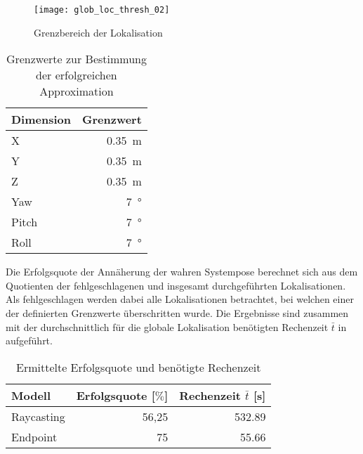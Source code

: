 \begin{figure}[!ht]
	\begin{center}
		\texttt{[image: glob\_loc\_thresh\_02]}
		\caption{Grenzbereich der Lokalisation}
		\label{fig.loclimits}
	\end{center}
\end{figure}

\begin{table}[ht]
	\centering
	\caption{Grenzwerte zur Bestimmung der erfolgreichen Approximation}
	\label{tab.thresh_glob}
	\vspace*{-3mm}
	\begin{tabular}[ht]{|l|r|}\hline
		\rowcolor{Snow2}
		Dimension		& Grenzwert 					\\ \hline
		X				& \SI{0,35}{\meter}			\\ \hline		
		Y				& \SI{0,35}{\meter}			\\ \hline
		Z				& \SI{0,35}{\meter}			\\ \hline
		Yaw				& \SI{7}{°}					\\ \hline
		Pitch			& \SI{7}{°}					\\ \hline
		Roll 			& \SI{7}{°}					\\ \hline
	\end{tabular} 
	\vspace*{-3mm}
\end{table}

Die Erfolgsquote der Annäherung der wahren Systempose berechnet sich aus dem Quotienten der fehlgeschlagenen und insgesamt durchgeführten Lokalisationen. Als fehlgeschlagen werden dabei alle Lokalisationen betrachtet, bei welchen einer der definierten Grenzwerte überschritten wurde. Die Ergebnisse sind zusammen mit der durchschnittlich für die globale Lokalisation benötigten Rechenzeit $\bar{t}$ in  aufgeführt.

\begin{table}[ht]
	\centering
	\caption{Ermittelte Erfolgsquote und benötigte Rechenzeit}
	\label{tab.approx_time}
	\vspace*{-3mm}
	\begin{tabular}[ht]{|l|r|r|}\hline
		\rowcolor{Snow2}
		Modell			& Erfolgsquote [$\%$]	&	Rechenzeit $\bar{t}$	 [s]	\\ \hline
		Raycasting		& 56,25					&	\SI{532,89}{}			\\ \hline		
		Endpoint			& 75					&	\SI{55,66}{}			\\ \hline
	\end{tabular} 
	\vspace*{-3mm}
\end{table}

